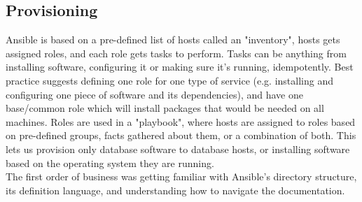         \subsection{Provisioning}
            Ansible is based on a pre-defined list of hosts called an "inventory", hosts gets assigned roles, and each role gets tasks to perform. Tasks can be anything from installing software, configuring it or making sure it's running, idempotently. Best practice suggests defining one role for one type of service (e.g. installing and configuring one piece of software and its dependencies), and have one base/common role which will install packages that would be needed on all machines. Roles are used in a "playbook", where hosts are assigned to roles based on pre-defined groups, facts gathered about them, or a combination of both. This lets us provision only database software to database hosts, or installing software based on the operating system they are running.\\
            
            The first order of business was getting familiar with Ansible's directory structure, its definition language, and understanding how to navigate the documentation.


